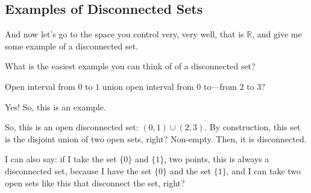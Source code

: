 \subsection{Examples of Disconnected Sets}

\begin{speech}[01:24:03 - 01:24:33]
And now let's go to the space you control very, very well, that is $\mathbb{R}$, and give me some example of a disconnected set.

What is the easiest example you can think of of a disconnected set?
\end{speech}

\begin{student}
Open interval from $0$ to $1$ union open interval from $0$ to---from $2$ to $3$?
\end{student}

\begin{speech}[01:24:37 - 01:25:29]
Yes! So, this is an example. 

So, this is an open disconnected set: $(0, 1) \cup (2, 3)$. By construction, this set is the disjoint union of two open sets, right? Non-empty. Then, it is disconnected.

I can also say: if I take the set $\{0\}$ and $\{1\}$,  two points, this is always a disconnected set, because I have the set $\{0\}$ and the set $\{1\}$, and I can take two open sets like this that disconnect the set, right? 
\end{speech}

